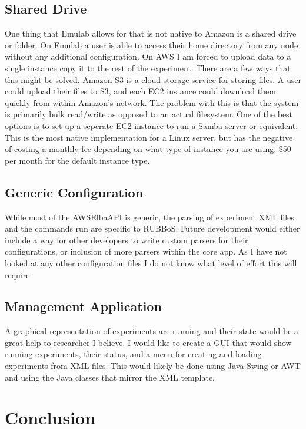 \documentclass{article}
\begin{document}
\subsection{Shared Drive}
One thing that Emulab allows for that is not native to Amazon is a shared drive or folder. On Emulab a user is able to access their home directory from any node without any additional configuration. On AWS I am forced to upload data to a single instance copy it to the rest of the experiment. There are a few ways that this might be solved.
Amazon S3 is a cloud storage service for storing files. A user could upload their files to S3, and each EC2 instance could download them quickly from within Amazon's network. The problem with this is that the system is primarily bulk read/write as opposed to an actual filesystem. One of the best options is to set up a seperate EC2 instance to run a Samba server or equivalent. This is the most native implementation for a Linux server, but has the negative of costing a monthly fee depending on what type of instance you are using, \$50 per month for the default instance type.
\subsection{Generic Configuration}
While most of the AWSElbaAPI is generic, the parsing of experiment XML files and the commands run are specific to RUBBoS. Future development would either include a way for other developers to write custom parsers for their configurations, or inclusion of more parsers within the core app. As I have not looked at any other configuration files I do not know what level of effort this will require.
\subsection{Management Application}
A graphical representation of experiments are running and their state would be a great help to researcher I believe. I would like to create a GUI that would show running experiments, their status, and a menu for creating and loading experiments from XML files. This would likely be done using Java Swing or AWT and using the Java classes that mirror the XML template.
\section{Conclusion}



\end{document}
